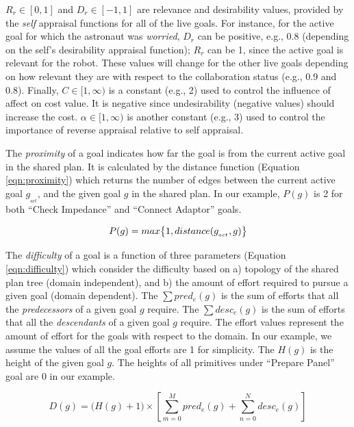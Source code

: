 \documentclass[conference]{IEEEtran}
\begin{document}
$R_r\in[0,1]$ and $D_r\in[-1,1]$ are relevance and desirability values, provided
by the \textit{self} appraisal functions for all of the live goals. For
instance, for the active goal for which the astronaut was \textit{worried},
$D_r$ can be positive, e.g., 0.8 (depending on the self's desirability appraisal
function); $R_r$ can be 1, since the active goal is relevant for the robot.
These values will change for the other live goals depending on how
relevant they are with respect to the collaboration status (e.g., 0.9 and 0.8).
Finally, $C\in[1,\infty)$ is a constant (e.g., 2) used to control the influence
of affect on cost value. It is negative since undesirability (negative values)
should increase the cost. $\alpha\in[1,\infty)$ is another constant (e.g., 3)
used to control the importance of reverse appraisal relative to self appraisal.

The \textit{proximity} of a goal indicates how far the goal is from the current
active goal in the shared plan. It is calculated by the distance function
(Equation \ref{eqn:proximity}) which returns the number of edges between the
current active goal $g_{_{act}}$, and the given goal $g$ in the shared plan. In
our example, $P(g)$ is 2 for both ``Check Impedance'' and ``Connect Adaptor''
goals.

\vspace*{-3mm}
\begin{equation}
P(g) = max\big\{1, distance(g_{_{act}},g)\big\}
\label{eqn:proximity}
\vspace*{-1mm}
\end{equation}

The \textit{difficulty} of a goal is a function of three parameters (Equation
\ref{eqn:difficulty}) which consider the difficulty based on a) topology of the
shared plan tree (domain independent), and b) the amount of effort required to
pursue a given goal (domain dependent). The $\sum pred_e(g)$ is the sum of
efforts that all the \textit{predecessors} of a given goal $g$ require. The
$\sum desc_e(g)$ is the sum of efforts that all the \textit{descendants} of a
given goal $g$ require. The effort values represent the amount of effort for the
goals with respect to the domain. In our example, we assume the values of all
the goal efforts are 1 for simplicity. The $H(g)$ is the height of the given
goal $g$. The heights of all primitives under ``Prepare Panel'' goal are 0 in
our example.

\vspace*{-5mm}
\begin{equation}
D(g) = \Big(H(g)+1\Big)\times\left[\sum\limits_{m=0}^{M} pred_e(g) +
\sum\limits_{n=0}^{N} desc_e(g)\right]
\label{eqn:difficulty}
\end{equation}
\end{document}
